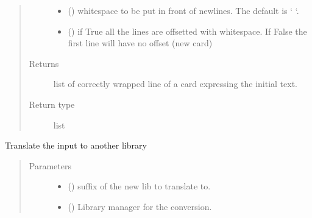 \documentclass[letterpaper,10pt,english]{sphinxmanual}
\begin{document}
\begin{fulllineitems}
\begin{fulllineitems}
\begin{quote}
\begin{description}
\begin{itemize}
\item {} 
\sphinxAtStartPar
{} (\sphinxstyleliteralemphasis{\sphinxupquote{, }}) \textendash{} whitespace to be put in front of newlines. The default is ‘      ‘.

\item {} 
\sphinxAtStartPar
{} (\sphinxstyleliteralemphasis{\sphinxupquote{, }}) \textendash{} if True all the lines are off\sphinxhyphen{}setted with whitespace. If False
the first line will have no offset (new card)

\end{itemize}

\item[{Returns}] \leavevmode
\sphinxAtStartPar
list of correctly wrapped line of a card expressing the initial
text.

\item[{Return type}] \leavevmode
\sphinxAtStartPar
list

\end{description}\end{quote}

\end{fulllineitems}


\begin{fulllineitems}
\label{\detokenize{api/inputgeneration:inputfile.InputFile.translate}}
\sphinxAtStartPar
Translate the input to another library
\begin{quote}\begin{description}
\item[{Parameters}] \leavevmode\begin{itemize}
\item {} 
\sphinxAtStartPar
{} () \textendash{} suffix of the new lib to translate to.

\item {} 
\sphinxAtStartPar
{} ({\hyperref[\detokenize{api/initobjects:libmanager.LibManager}]{}}) \textendash{} Library manager for the conversion.


\end{itemize}
\end{description}
\end{quote}
\end{fulllineitems}
\end{fulllineitems}
\end{document}

